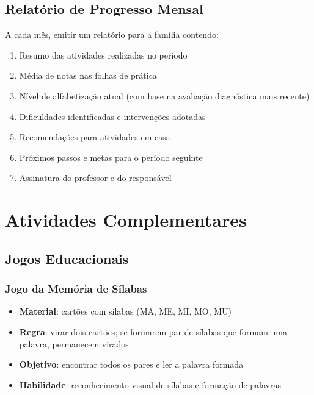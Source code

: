 \section{Relat\'{o}rio de Progresso Mensal}

A cada m\^{e}s, emitir um relat\'{o}rio para a fam\'{i}lia contendo:

\begin{enumerate}[leftmargin=2cm]
  \item Resumo das atividades realizadas no per\'{i}odo
  \item M\'{e}dia de notas nas folhas de pr\'{a}tica
  \item N\'{i}vel de alfabetiza\c{c}\~{a}o atual (com base na
  avalia\c{c}\~{a}o diagn\'{o}stica mais recente)
  \item Dificuldades identificadas e interven\c{c}\~{o}es adotadas
  \item Recomenda\c{c}\~{o}es para atividades em casa
  \item Pr\'{o}ximos passos e metas para o per\'{i}odo seguinte
  \item Assinatura do professor e do respons\'{a}vel
\end{enumerate}


\chapter{Atividades Complementares}

\section{Jogos Educacionais}

\subsection{Jogo da Mem\'{o}ria de S\'{i}labas}
\begin{itemize}[leftmargin=2cm]
  \item \textbf{Material}: cart\~{o}es com s\'{i}labas (MA, ME, MI, MO, MU)
  \item \textbf{Regra}: virar dois cart\~{o}es; se formarem par de s\'{i}labas
  que formam uma palavra, permanecem virados
  \item \textbf{Objetivo}: encontrar todos os pares e ler a palavra formada
  \item \textbf{Habilidade}: reconhecimento visual de s\'{i}labas e
  forma\c{c}\~{a}o de palavras
\end{itemize}


